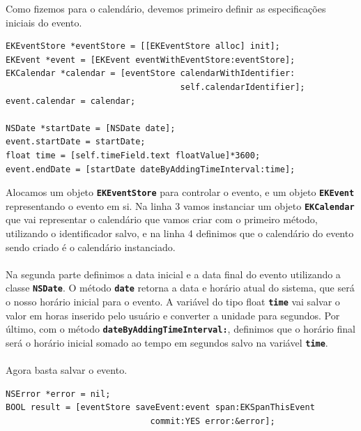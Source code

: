 \documentclass[a4paper,12pt,brazil,doubleside]{book}
\begin{document}
Como fizemos para o calendário, devemos primeiro definir as especificações iniciais do evento.

\pagebreak

\begin{listing}
\begin{verbatim}
EKEventStore *eventStore = [[EKEventStore alloc] init];
EKEvent *event = [EKEvent eventWithEventStore:eventStore];
EKCalendar *calendar = [eventStore calendarWithIdentifier:
                                   self.calendarIdentifier];
event.calendar = calendar;
    
NSDate *startDate = [NSDate date];
event.startDate = startDate;
float time = [self.timeField.text floatValue]*3600;
event.endDate = [startDate dateByAddingTimeInterval:time];
\end{verbatim}
\end{listing}

Alocamos um objeto \texttt{\textbf{EKEventStore}} para controlar o evento, e um objeto \texttt{\textbf{EKEvent}} representando o evento em si. Na linha 3 vamos instanciar um objeto \texttt{\textbf{EKCalendar}} que vai representar o calendário que vamos criar com o primeiro método, utilizando o identificador salvo, e na linha 4 definimos que o calendário do evento sendo criado é o calendário instanciado.
\paragraph{}Na segunda parte definimos a data inicial e a data final do evento utilizando a classe \texttt{\textbf{NSDate}}. O método \texttt{\textbf{date}} retorna a data e horário atual do sistema, que será o nosso horário inicial para o evento. A variável do tipo float \texttt{\textbf{time}} vai salvar o valor em horas inserido pelo usuário e converter a unidade para segundos. Por último, com o método \texttt{\textbf{dateByAddingTimeInterval:}}, definimos que o horário final será o horário inicial somado ao tempo em segundos salvo na variável \texttt{\textbf{time}}.
\paragraph{}Agora basta salvar o evento.

\begin{listing}
\begin{verbatim}
NSError *error = nil;
BOOL result = [eventStore saveEvent:event span:EKSpanThisEvent
                             commit:YES error:&error];
\end{verbatim}
\end{listing}
\end{document}
